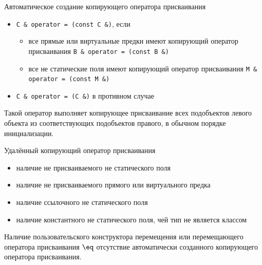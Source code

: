 \documentclass[unknownkeysallowed,xcolor=table]{beamer}
\begin{document}
\begin{frame}{Автоматическое создание копирующего оператора присваивания}
  \begin{itemize}
    \item \lstinline{C & operator = (const C &)}, если
      \begin{itemize}
        \item все прямые или виртуальные предки имеют копирующий оператор присваивания \lstinline{B & operator = (const B &)}
        \item все не статические поля имеют копирующий оператор присваивания \lstinline{M & operator = (const M &)}
      \end{itemize}
    \item \lstinline{C & operator = (C &)} в противном случае
  \end{itemize}

  \vspace{1em}

  Такой оператор выполняет копирующее присваивание всех подобъектов левого объекта из соответствующих подобъектов правого, в обычном порядке инициализации.
\end{frame}

\begin{frame}{Удалённый копирующий оператор присваивания}
  \begin{itemize}
    \item наличие не присваиваемого не статического поля \vspace{0.5em}
    \item наличие не присваиваемого прямого или виртуального предка \vspace{0.5em}
    \item наличие ссылочного не статического поля \vspace{0.5em}
    \item наличие константного не статического поля, чей тип не является классом
  \end{itemize}

  \vspace{1em}

  Наличие пользовательского конструктора перемещения или перемещающего оператора присваивания $\eq$ отсутствие автоматически созданного копирующего оператора
  присваивания.
\end{frame}
\end{document}
